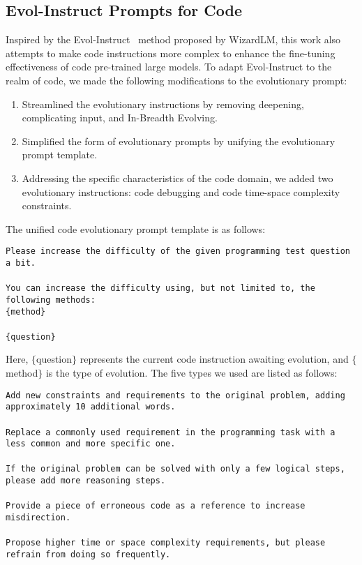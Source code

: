 \documentclass{article}
\begin{document}
\subsection{Evol-Instruct Prompts for Code}
Inspired by the Evol-Instruct~\cite{xu2023wizardlm} method proposed by WizardLM, this work also attempts to make code instructions more complex to enhance the fine-tuning effectiveness of code pre-trained large models. To adapt Evol-Instruct to the realm of code, we made the following modifications to the evolutionary prompt:
\begin{enumerate}
\item Streamlined the evolutionary instructions by removing deepening, complicating input, and In-Breadth Evolving.
\item Simplified the form of evolutionary prompts by unifying the evolutionary prompt template.
\item Addressing the specific characteristics of the code domain, we added two evolutionary instructions: code debugging and code time-space complexity constraints.
\end{enumerate}
The unified code evolutionary prompt template is as follows:
\begin{boxEnv}
\texttt{Please increase the difficulty of the given programming test question a bit. \\\\You can increase the difficulty using, but not limited to, the following methods:\\ \{method\}\\\\ \{question\}}
\end{boxEnv}
Here, $\{$question$\}$ represents the current code instruction awaiting evolution, and $\{$method$\}$ is the type of evolution. The five types we used are listed as follows:
\begin{boxEnv}
\texttt{Add new constraints and requirements to the original problem, adding approximately 10 additional words.\\\\Replace a commonly used requirement in the programming task with a less common and more specific one.\\\\If the original problem can be solved with only a few logical steps, please add more reasoning steps.\\\\Provide a piece of erroneous code as a reference to increase misdirection.\\\\Propose higher time or space complexity requirements, but please refrain from doing so frequently.}
\end{boxEnv}
\end{document}
